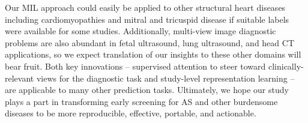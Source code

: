 Our MIL approach could easily be applied to other structural heart diseases including cardiomyopathies and mitral and tricuspid disease if suitable labels were available for some studies. Additionally, multi-view image diagnostic problems are also abundant in fetal ultrasound, lung ultrasound, and head CT applications, so we expect translation of our insights to these other domains will bear fruit. Both key innovations -- supervised attention to steer toward clinically-relevant views for the diagnostic task and study-level representation learning -- are applicable to many other prediction tasks.
Ultimately, we hope our study plays a part in transforming early screening for AS and other burdensome diseases to be more reproducible, effective, portable, and actionable. 